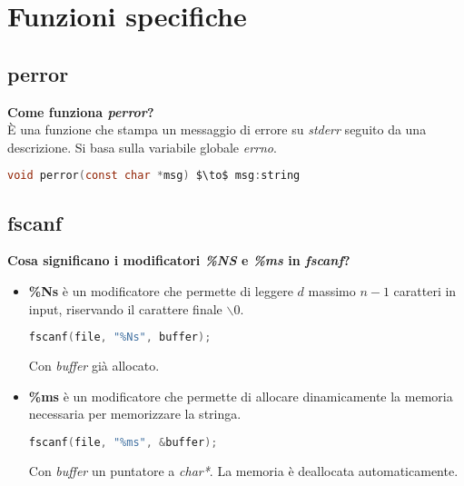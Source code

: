 \newpage
\section{Funzioni specifiche}
\subsection{perror}
\textbf{Come funziona \textit{perror}?}\\
È una funzione che stampa un messaggio di errore su \textit{stderr} seguito da una descrizione. Si basa sulla variabile globale \textit{errno}.
\begin{lstlisting}[language=C, mathescape]
	void perror(const char *msg) $\to$ msg:string
\end{lstlisting}

\subsection{fscanf}
\textbf{Cosa significano i modificatori \textit{\%NS} e \textit{\%ms} in \textit{fscanf}?}\\
\begin{itemize}
	\item \textbf{\%Ns} è un modificatore che permette di leggere $d$ massimo $n-1$ caratteri in input, riservando il carattere finale \textit{$\backslash 0$}.
	\begin{lstlisting}[language=C]
		fscanf(file, "%Ns", buffer);
	\end{lstlisting}
	Con \textit{buffer} già allocato.
	\item \textbf{\%ms} è un modificatore che permette di allocare dinamicamente la memoria necessaria per memorizzare la stringa.
	\begin{lstlisting}[language=C]
		fscanf(file, "%ms", &buffer);
	\end{lstlisting}
	Con \textit{buffer} un puntatore a \textit{char*}. La memoria è deallocata automaticamente.
\end{itemize}

